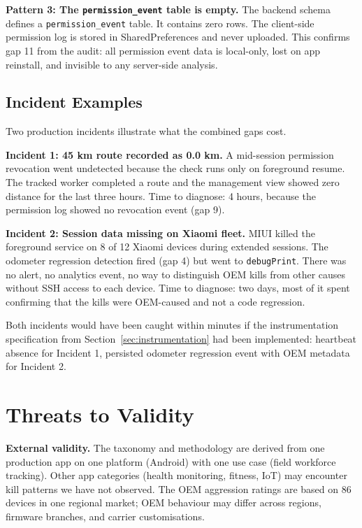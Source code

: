 \documentclass[10pt,journal,compsoc]{IEEEtran}
\begin{document}
\textbf{Pattern 3: The \texttt{permission\_event} table is empty.}
The backend schema defines a \texttt{permission\_event} table. It
contains zero rows. The client-side permission log is stored in
SharedPreferences and never uploaded. This confirms gap 11 from the
audit: all permission event data is local-only, lost on app reinstall,
and invisible to any server-side analysis.

\subsection{Incident Examples}

Two production incidents illustrate what the combined gaps cost.

\textbf{Incident 1: 45 km route recorded as 0.0 km.} A mid-session
permission revocation went undetected because the check runs only on
foreground resume. The tracked worker completed a route and the
management view showed zero distance for the last three hours. Time to
diagnose: 4 hours, because the permission log showed no revocation event
(gap 9).

\textbf{Incident 2: Session data missing on Xiaomi fleet.} MIUI killed
the foreground service on 8 of 12 Xiaomi devices during extended
sessions. The odometer regression detection fired (gap 4) but went to
\texttt{debugPrint}. There was no alert, no analytics event, no way to
distinguish OEM kills from other causes without SSH access to each
device. Time to diagnose: two days, most of it spent confirming that the
kills were OEM-caused and not a code regression.

Both incidents would have been caught within minutes if the
instrumentation specification from Section~\ref{sec:instrumentation} had
been implemented: heartbeat absence for Incident 1, persisted odometer
regression event with OEM metadata for Incident 2.


\section{Threats to Validity}
\label{sec:threats}

\textbf{External validity.} The taxonomy and methodology are derived
from one production app on one platform (Android) with one use case
(field workforce tracking). Other app categories (health monitoring,
fitness, IoT) may encounter kill patterns we have not observed. The
OEM aggression ratings are based on 86 devices in one regional market;
OEM behaviour may differ across regions, firmware branches, and carrier
customisations.
\end{document}
